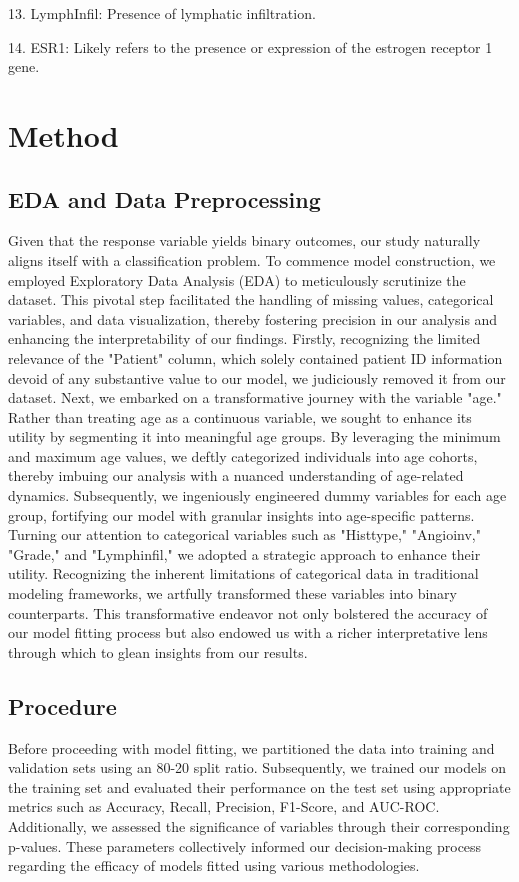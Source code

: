 \documentclass[11pt,singlespace]{article}
\begin{document}
	13. LymphInfil: Presence of lymphatic infiltration.
	
	14. ESR1: Likely refers to the presence or expression of the estrogen receptor 1 gene.
	
	\section{Method}
	\subsection{EDA and Data Preprocessing}
	Given that the response variable yields binary outcomes, our study naturally aligns itself with a classification problem. To commence model construction, we employed Exploratory Data Analysis (EDA) to meticulously scrutinize the dataset. This pivotal step facilitated the handling of missing values, categorical variables, and data visualization, thereby fostering precision in our analysis and enhancing the interpretability of our findings. Firstly, recognizing the limited relevance of the "Patient" column, which solely contained patient ID information devoid of any substantive value to our model, we judiciously removed it from our dataset. Next, we embarked on a transformative journey with the variable "age." Rather than treating age as a continuous variable, we sought to enhance its utility by segmenting it into meaningful age groups. By leveraging the minimum and maximum age values, we deftly categorized individuals into age cohorts, thereby imbuing our analysis with a nuanced understanding of age-related dynamics. Subsequently, we ingeniously engineered dummy variables for each age group, fortifying our model with granular insights into age-specific patterns.
	\\
	
	Turning our attention to categorical variables such as "Histtype," "Angioinv," "Grade," and "Lymphinfil," we adopted a strategic approach to enhance their utility. Recognizing the inherent limitations of categorical data in traditional modeling frameworks, we artfully transformed these variables into binary counterparts. This transformative endeavor not only bolstered the accuracy of our model fitting process but also endowed us with a richer interpretative lens through which to glean insights from our results.
	
	\subsection{Procedure}
	Before proceeding with model fitting, we partitioned the data into training and validation sets using an 80-20 split ratio. Subsequently, we trained our models on the training set and evaluated their performance on the test set using appropriate metrics such as Accuracy, Recall, Precision, F1-Score, and AUC-ROC. Additionally, we assessed the significance of variables through their corresponding p-values. These parameters collectively informed our decision-making process regarding the efficacy of models fitted using various methodologies.
	
\end{document}
